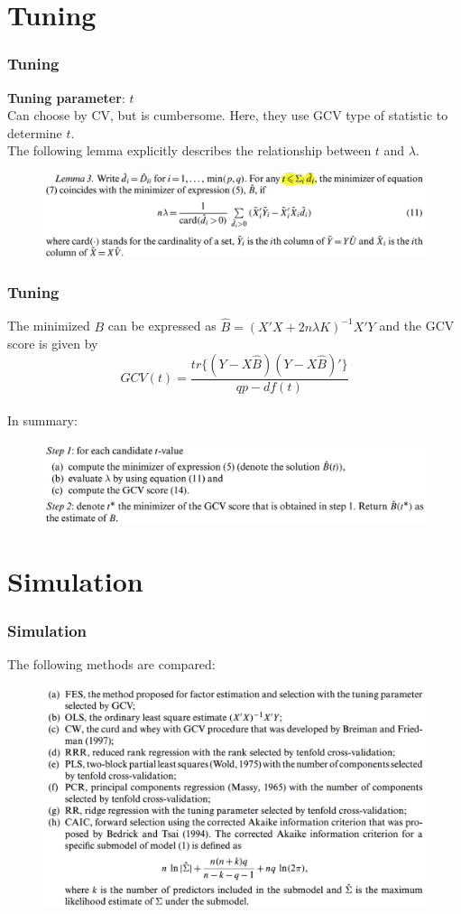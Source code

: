 \documentclass{beamer}
\begin{document}
	\section{Tuning}
	\begin{frame}
		\frametitle{Tuning}
		\textbf{Tuning parameter}: $t$\\
		Can choose by CV, but is cumbersome. Here, they use GCV type of statistic to determine $t$.\\
		The following lemma explicitly describes the relationship between $t$ and $\lambda$.
		\begin{figure}
			\includegraphics[width=1\linewidth]{image003.png}
		\end{figure}
	\end{frame}
	
	\begin{frame}
		\frametitle{Tuning}
		The minimized $B$ can be expressed as $\hat{B} = (X'X + 2n\lambda K)^{-1}X'Y$ and the GCV score is given by
		$$GCV(t) = \frac{tr\{(Y-X\hat{B})(Y-X\hat{B})'\}}{qp-df(t)}$$\\
		In summary:
		\begin{figure}
			\includegraphics[width=1\linewidth]{image004.png}
		\end{figure}
	\end{frame}
	
	\section{Simulation}
	\begin{frame}
		\frametitle{Simulation}
		The following methods are compared:
		\begin{figure}
			\includegraphics[width=1\linewidth]{image005.png}
		\end{figure}
	\end{frame}
	
\end{document}
